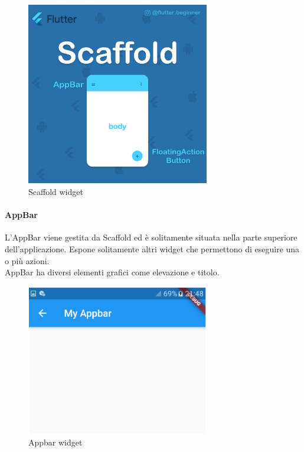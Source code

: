\begin{figure}[htbp]	
	\centering
	\includegraphics[width=8cm]{immagini/scaffold.png}
	\caption{Scaffold widget}
	\label{fig:Scaffold widget}
\end{figure}

\newpage

\paragraph{AppBar}
L'AppBar viene gestita da Scaffold ed è solitamente situata nella parte superiore dell'applicazione. Espone solitamente altri widget che permettono di eseguire una o più azioni.\\
AppBar ha diversi elementi grafici come elevazione e titolo.
\begin{figure}[htbp]	
	\centering
	\includegraphics[width=8cm]{immagini/appbar.png}
	\caption{Appbar widget}
	\label{fig:Appbar widget}
\end{figure}

